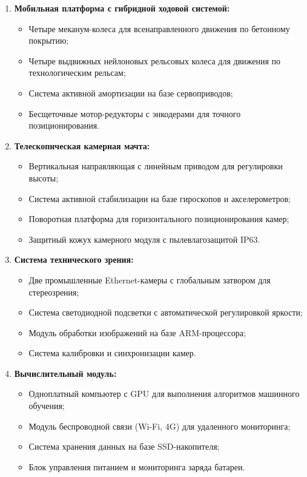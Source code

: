 \documentclass[12pt,a4paper]{article}
\begin{document}
\begin{enumerate}
\item \textbf{Мобильная платформа с гибридной ходовой системой:}
   \begin{itemize}
   \item Четыре меканум-колеса для всенаправленного движения по бетонному покрытию;
   \item Четыре выдвижных нейлоновых рельсовых колеса для движения по технологическим рельсам;
   \item Система активной амортизации на базе сервоприводов;
   \item Бесщеточные мотор-редукторы с энкодерами для точного позиционирования.
   \end{itemize}

\item \textbf{Телескопическая камерная мачта:}
   \begin{itemize}
   \item Вертикальная направляющая с линейным приводом для регулировки высоты;
   \item Система активной стабилизации на базе гироскопов и акселерометров;
   \item Поворотная платформа для горизонтального позиционирования камер;
   \item Защитный кожух камерного модуля с пылевлагозащитой IP63.
   \end{itemize}

\item \textbf{Система технического зрения:}
   \begin{itemize}
   \item Две промышленные Ethernet-камеры с глобальным затвором для стереозрения;
   \item Система светодиодной подсветки с автоматической регулировкой яркости;
   \item Модуль обработки изображений на базе ARM-процессора;
   \item Система калибровки и синхронизации камер.
   \end{itemize}

\item \textbf{Вычислительный модуль:}
   \begin{itemize}
   \item Одноплатный компьютер с GPU для выполнения алгоритмов машинного обучения;
   \item Модуль беспроводной связи (Wi-Fi, 4G) для удаленного мониторинга;
   \item Система хранения данных на базе SSD-накопителя;
   \item Блок управления питанием и мониторинга заряда батареи.
   \end{itemize}


\end{enumerate}
\end{document}
